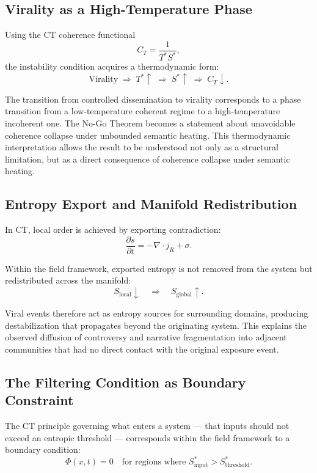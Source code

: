 \documentclass[12pt,a4paper]{article}
\begin{document}
\subsection{Virality as a High-Temperature Phase}

Using the CT coherence functional
\[
C_T = \frac{1}{T^* S^*},
\]
the instability condition acquires a thermodynamic form:
\[
\text{Virality} \;\Rightarrow\; T^* \uparrow \;\Rightarrow\; S^* \uparrow \;\Rightarrow\; C_T \downarrow.
\]

The transition from controlled dissemination to virality corresponds to a phase transition from a low-temperature coherent regime to a high-temperature incoherent one. The No-Go Theorem becomes a statement about unavoidable coherence collapse under unbounded semantic heating. This thermodynamic interpretation allows the result to be understood not only as a structural limitation, but as a direct consequence of coherence collapse under semantic heating.


\subsection{Entropy Export and Manifold Redistribution}

In CT, local order is achieved by exporting contradiction:
\[
\frac{\partial s}{\partial t} = -\nabla \cdot j_R + \sigma.
\]

Within the field framework, exported entropy is not removed from the system but redistributed across the manifold:
\[
S_{\text{local}} \downarrow \quad \Longrightarrow \quad S_{\text{global}} \uparrow.
\]

Viral events therefore act as entropy sources for surrounding domains, producing destabilization that propagates beyond the originating system. This explains the observed diffusion of controversy and narrative fragmentation into adjacent communities that had no direct contact with the original exposure event.

\subsection{The Filtering Condition as Boundary Constraint}

The CT principle governing what enters a system --- that inputs should not exceed an entropic threshold --- corresponds within the field framework to a boundary condition:
\[
\Phi(x,t) = 0 \quad \text{for regions where } S^*_{\text{input}} > S^*_{\text{threshold}}.
\]
\end{document}
